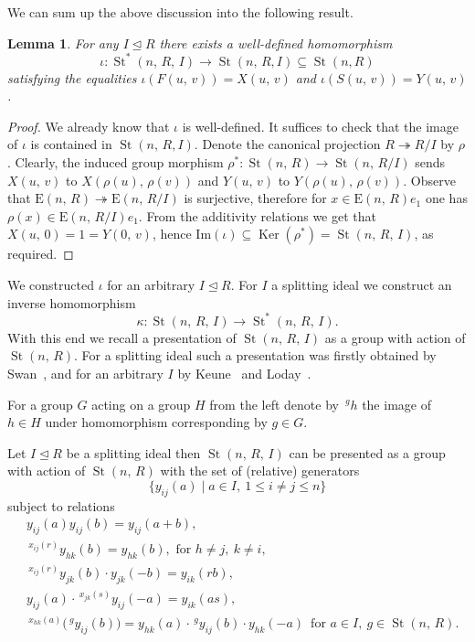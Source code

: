 \documentclass[11pt]{amsart}
\theoremstyle{plain} \declaretheorem[name=Theorem, Refname={Theorem,Theorems}]{tm} \Crefname{tm}{Theorem}{Theorems}
\numberwithin{equation}{section}
\newtheorem{lm}{Lemma} \numberwithin{lm}{section} \Crefname{lm}{Lemma}{Lemmas}
\theoremstyle{definition} \newtheorem{df}[lm]{Definition} \Crefname{df}{Definition}{Definitions}
\theoremstyle{remark} \newtheorem{rk}[lm]{Remark} \Crefname{rk}{Remark}{Remarks}
\newcommand{\Ker}{\mathop{\mathrm{Ker}}\nolimits}
\newcommand{\E}{{\mathrm{E}}}
\newcommand{\St}{\mathop{\mathrm{St}}\nolimits}
\newcommand{\epi}{\twoheadrightarrow}
\begin{document}
We can sum up the above discussion into the following result.
\begin{lm} \label{lm:map-iota}
 For any $I \trianglelefteq R$ there exists a well-defined homomorphism $$\iota\colon\St^*(n,\,R,\,I)\rightarrow\St(n,\,R, I) \subseteq \St(n, R)$$ 
 satisfying the equalities $\iota (F(u,\,v)) = X(u,\,v)$ and $\iota (S(u,\,v)) = Y(u,\,v)$. \end{lm}
\begin{proof}
We already know that $\iota$ is well-defined. It suffices to check that the image of $\iota$ is contained in $\St(n,\,R,I)$.
Denote the canonical projection $R\epi R/I$ by $\rho$.
Clearly, the induced group morphism $\rho^*\colon\St(n,\,R)\rightarrow\St(n,\,R/I)$ sends $X(u,\,v)$ to $X(\rho(u),\,\rho(v))$ and $Y(u,\,v)$ to $Y(\rho(u),\,\rho(v))$. 
Observe that $\E(n,\,R)\epi\E(n,\,R/I)$ is surjective, therefore for $x\in\E(n,\,R)e_1$ one has $\rho(x)\in\E(n,\,R/I)e_1$. 
From the additivity relations we get that $X(u,\,0)=1=Y(0,\,v)$, hence $\mathrm{Im}(\iota)\subseteq\Ker(\rho^*)=\St(n,\,R,\,I)$, as required. \end{proof}

 

We constructed $\iota$ for an arbitrary $I\trianglelefteq R$. For $I$ a splitting ideal we construct an inverse homomorphism
$$
\kappa\colon\St(n,\,R,\,I)\rightarrow\St^*(n,\,R,\,I).
$$
With this end we recall a presentation of $\St(n,\,R,\,I)$ as a group with action of $\St(n,\,R)$. For a splitting ideal such a presentation was firstly obtained by Swan~\cite{Swa1,Swa2,Swa3}, and for an arbitrary $I$ by Keune~\cite{Keu} and Loday~\cite{Lod}.

For a group $G$ acting on a group $H$ from the left denote by $\!\,^gh$ the image of $h\in H$ under homomorphism corresponding by $g\in G$.

Let $I\trianglelefteq R$ be a splitting ideal then $\St(n,\,R,\,I)$ can be presented as a group with action of $\St(n,\,R)$ with the set of (relative) generators
$$
\{y_{ij}(a)\mid a\in I,\ 1\leq i\neq j\leq n\}
$$
subject to relations
\setcounter{equation}{0}
\renewcommand{\theequation}{KL\arabic{equation}}
\begin{align}
&y_{ij}(a)y_{ij}(b)=y_{ij}(a+b),\\
&\!\,^{x_{ij}(r)}y_{hk}(b)=y_{hk}(b),\text{ for }h\neq j,\ k\neq i,\\
&\!\,^{x_{ij}(r)}y_{jk}(b)\cdot y_{jk}(-b)=y_{ik}(rb),\\
&y_{ij}(a)\cdot\,^{x_{jk}(s)}y_{ij}(-a)=y_{ik}(as),\\
&\!\,^{x_{hk}(a)}\big(\!\,^gy_{ij}(b)\big)=y_{hk}(a)\cdot\,^gy_{ij}(b)\cdot y_{hk}(-a)\,\text{ for }a\in I,\ g\in\St(n,\,R).
\end{align}
\end{document}
